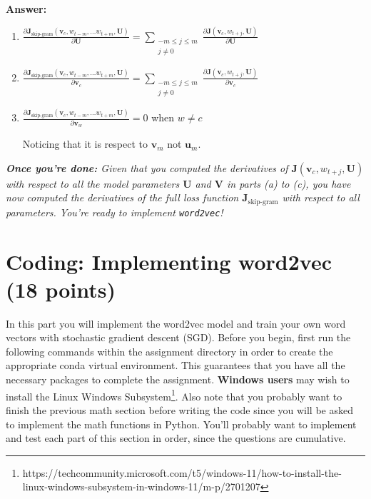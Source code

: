 \documentclass{article}
\newenvironment{answer}{
    {\bf Answer:} \sf \begingroup\color{red}
}{\endgroup}%
\begin{document}
\begin{enumerate}[label=(\alph*)]
\begin{shaded}
\begin{answer}
\begin{enumerate}[label=(\roman*)]
    \item ${\frac{\partial \bm J_{\textrm{skip-gram}}(\bm v_c, w_{t-m},\ldots w_{t+m}, \bm U)} {\partial \bm U}} =\sum_{\substack{-m\le j \le m \\ j\ne 0}}{\frac{\partial \bm J(\bm v_c, w_{t+j}, \bm U)}{\partial \bm U}}$
    \item ${\frac{\partial \bm J_{\textrm{skip-gram}}(\bm v_c, w_{t-m},\ldots w_{t+m}, \bm U)} {\partial \bm v_c}} = \sum_{\substack{-m\le j \le m \\ j\ne 0}}{\frac{\partial \bm J(\bm v_c, w_{t+j}, \bm U)}{\partial \bm v_c}}$
    \item ${\frac{\partial \bm J_{\textrm{skip-gram}}(\bm v_c, w_{t-m},\ldots w_{t+m}, \bm U)} {\partial \bm v_w}} = 0$ when $w \ne c$
    
    Noticing that it is respect to $\bm v_m$ not $\bm u_m$.
\end{enumerate}
\end{answer}
\end{shaded}

\textit{\textbf{Once you're done:} Given that you computed the derivatives of $\bm J(\bm v_c, w_{t+j}, \bm U)$ with respect to all the model parameters $\bm U$ and $\bm V$ in parts (a) to (c), you have now computed the derivatives of the full loss function $\bm J_{\text{skip-gram}}$ with respect to all parameters. You're ready to implement \texttt{word2vec}!} %

\end{enumerate}

\section{Coding: Implementing word2vec (18 points)}
In this part you will implement the word2vec model and train your own word vectors with stochastic gradient descent (SGD). Before you begin, first run the following commands within the assignment directory in order to create the appropriate conda virtual environment. This guarantees that you have all the necessary packages to complete the assignment. \textbf{Windows users} may wish to install the Linux Windows Subsystem\footnote{https://techcommunity.microsoft.com/t5/windows-11/how-to-install-the-linux-windows-subsystem-in-windows-11/m-p/2701207}. Also note that you probably want to finish the previous math section before writing the code since you will be asked to implement the math functions in Python. You’ll probably want to implement and test each part of this section in order, since the questions are cumulative.
\end{document}
